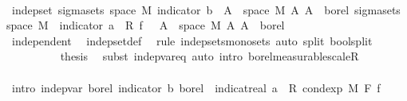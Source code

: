 \begin{isabellebody}
\ \ \ \ \ \ \ \ \isamarkupfalse%
\isanewline
\ \ \ \ \ \ \ \ \isamarkupfalse%
\ {\isachardoublequoteopen}indep{\isacharunderscore}{\kern0pt}set\ {\isacharparenleft}{\kern0pt}sigma{\isacharunderscore}{\kern0pt}sets\ {\isacharparenleft}{\kern0pt}space\ M{\isacharparenright}{\kern0pt}\ {\isacharbraceleft}{\kern0pt}indicator\ b\ {\isacharminus}{\kern0pt}{\isacharbackquote}{\kern0pt}\ A\ {\isasyminter}\ space\ M\ {\isacharbar}{\kern0pt}A{\isachardot}{\kern0pt}\ A\ {\isasymin}\ borel{\isacharbraceright}{\kern0pt}{\isacharparenright}{\kern0pt}\ {\isacharparenleft}{\kern0pt}sigma{\isacharunderscore}{\kern0pt}sets\ {\isacharparenleft}{\kern0pt}space\ M{\isacharparenright}{\kern0pt}\ {\isacharbraceleft}{\kern0pt}{\isacharparenleft}{\kern0pt}{\isasymlambda}{\isasymomega}{\isachardot}{\kern0pt}\ indicator\ a\ {\isasymomega}\ {\isacharasterisk}{\kern0pt}\isactrlsub R\ f\ {\isasymomega}{\isacharparenright}{\kern0pt}\ {\isacharminus}{\kern0pt}{\isacharbackquote}{\kern0pt}\ A\ {\isasyminter}\ space\ M\ {\isacharbar}{\kern0pt}A{\isachardot}{\kern0pt}\ A\ {\isasymin}\ borel{\isacharbraceright}{\kern0pt}{\isacharparenright}{\kern0pt}{\isachardoublequoteclose}\ \isanewline
\ \ \ \ \ \ \ \ \ \ \isamarkupfalse%
\ independent\ \isamarkupfalse%
\ indep{\isacharunderscore}{\kern0pt}set{\isacharunderscore}{\kern0pt}def\ \isamarkupfalse%
\ {\isacharparenleft}{\kern0pt}rule\ indep{\isacharunderscore}{\kern0pt}sets{\isacharunderscore}{\kern0pt}mono{\isacharunderscore}{\kern0pt}sets{\isacharcomma}{\kern0pt}\ auto\ split{\isacharcolon}{\kern0pt}\ bool{\isachardot}{\kern0pt}split{\isacharparenright}{\kern0pt}\isanewline
\ \ \ \ \ \ \ \ \isamarkupfalse%
\ {\isacharquery}{\kern0pt}thesis\ \isamarkupfalse%
\ {\isacharparenleft}{\kern0pt}subst\ indep{\isacharunderscore}{\kern0pt}var{\isacharunderscore}{\kern0pt}eq{\isacharcomma}{\kern0pt}\ auto\ intro{\isacharbang}{\kern0pt}{\isacharcolon}{\kern0pt}\ borel{\isacharunderscore}{\kern0pt}measurable{\isacharunderscore}{\kern0pt}scaleR{\isacharparenright}{\kern0pt}\isanewline
\ \ \ \ \ \ \isamarkupfalse%
\isanewline
\isanewline
\ \ \ \ \ \ \isamarkupfalse%
\ {\isacharbrackleft}{\kern0pt}intro{\isacharbrackright}{\kern0pt}{\isacharcolon}{\kern0pt}\ {\isachardoublequoteopen}indep{\isacharunderscore}{\kern0pt}var\ borel\ {\isacharparenleft}{\kern0pt}indicator\ b{\isacharparenright}{\kern0pt}\ borel\ {\isacharparenleft}{\kern0pt}{\isasymlambda}{\isasymomega}{\isachardot}{\kern0pt}\ indicat{\isacharunderscore}{\kern0pt}real\ a\ {\isasymomega}\ {\isacharasterisk}{\kern0pt}\isactrlsub R\ cond{\isacharunderscore}{\kern0pt}exp\ M\ F\ f\ {\isasymomega}{\isacharparenright}{\kern0pt}{\isachardoublequoteclose}\isanewline

\end{isabellebody}
